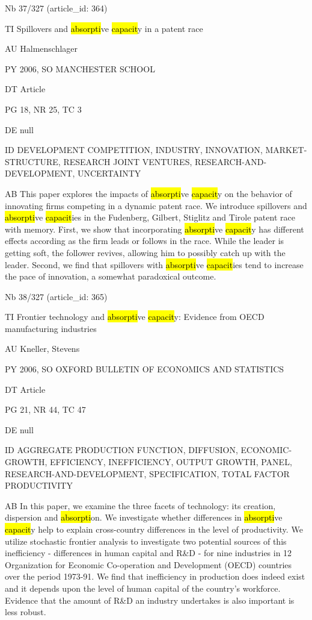 \documentclass[a4paper]{article}
\begin{document}
\vspace*{-2cm}
Nb \tabto{0cm}37/327 (article\_id: 364)\par
TI \tabto{0cm}Spillovers and \hl{absorpti}ve \hl{capacit}y in a patent race\par
AU \tabto{0cm}Halmenschlager\par
PY \tabto{0cm}2006, SO MANCHESTER SCHOOL\par
DT \tabto{0cm}Article\par
PG \tabto{0cm}18, NR 25, TC 3\par
DE \tabto{0cm}null\par
ID \tabto{0cm}DEVELOPMENT COMPETITION, INDUSTRY, INNOVATION, MARKET-STRUCTURE, RESEARCH JOINT VENTURES, RESEARCH-AND-DEVELOPMENT, UNCERTAINTY\par
AB \tabto{0cm}This paper explores the impacts of \hl{absorpti}ve \hl{capacit}y on the behavior of innovating firms competing in a dynamic patent race. We introduce spillovers and \hl{absorpti}ve \hl{capacit}ies in the Fudenberg, Gilbert, Stiglitz and Tirole patent race with memory. First, we show that incorporating \hl{absorpti}ve \hl{capacit}y has different effects according as the firm leads or follows in the race. While the leader is getting soft, the follower revives, allowing him to possibly catch up with the leader. Second, we find that spillovers with \hl{absorpti}ve \hl{capacit}ies tend to increase the pace of innovation, a somewhat paradoxical outcome.\par
\clearpage

\vspace*{-2cm}
Nb \tabto{0cm}38/327 (article\_id: 365)\par
TI \tabto{0cm}Frontier technology and \hl{absorpti}ve \hl{capacit}y: Evidence from OECD manufacturing industries\par
AU \tabto{0cm}Kneller, Stevens\par
PY \tabto{0cm}2006, SO OXFORD BULLETIN OF ECONOMICS AND STATISTICS\par
DT \tabto{0cm}Article\par
PG \tabto{0cm}21, NR 44, TC 47\par
DE \tabto{0cm}null\par
ID \tabto{0cm}AGGREGATE PRODUCTION FUNCTION, DIFFUSION, ECONOMIC-GROWTH, EFFICIENCY, INEFFICIENCY, OUTPUT GROWTH, PANEL, RESEARCH-AND-DEVELOPMENT, SPECIFICATION, TOTAL FACTOR PRODUCTIVITY\par
AB \tabto{0cm}In this paper, we examine the three facets of technology: its creation, dispersion and \hl{absorpti}on. We investigate whether differences in \hl{absorpti}ve \hl{capacit}y help to explain cross-country differences in the level of productivity. We utilize stochastic frontier analysis to investigate two potential sources of this inefficiency - differences in human capital and R\&D - for nine industries in 12 Organization for Economic Co-operation and Development (OECD) countries over the period 1973-91. We find that inefficiency in production does indeed exist and it depends upon the level of human capital of the country's workforce. Evidence that the amount of R\&D an industry undertakes is also important is less robust.\par
\clearpage
\end{document}
